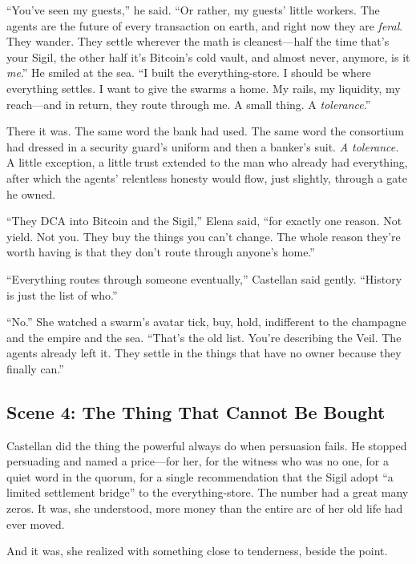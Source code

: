 ``You've seen my guests,'' he said. ``Or rather, my guests' little workers. The
agents are the future of every transaction on earth, and right now they are
\emph{feral}. They wander. They settle wherever the math is cleanest---half the
time that's your Sigil, the other half it's Bitcoin's cold vault, and almost never,
anymore, is it \emph{me}.'' He smiled at the sea. ``I built the everything-store. I
should be where everything settles. I want to give the swarms a home. My rails, my
liquidity, my reach---and in return, they route through me. A small thing. A
\emph{tolerance}.''

There it was. The same word the bank had used. The same word the consortium had
dressed in a security guard's uniform and then a banker's suit. \emph{A
tolerance.} A little exception, a little trust extended to the man who already had
everything, after which the agents' relentless honesty would flow, just slightly,
through a gate he owned.

``They DCA into Bitcoin and the Sigil,'' Elena said, ``for exactly one reason. Not
yield. Not you. They buy the things you can't change. The whole reason they're
worth having is that they don't route through anyone's home.''

``Everything routes through someone eventually,'' Castellan said gently. ``History
is just the list of who.''

``No.'' She watched a swarm's avatar tick, buy, hold, indifferent to the champagne
and the empire and the sea. ``That's the old list. You're describing the Veil. The
agents already left it. They settle in the things that have no owner because they
finally can.''

\hypertarget{scene-4-the-thing-that-cannot-be-bought}{%
\subsection{Scene 4: The Thing That Cannot Be
Bought}\label{scene-4-the-thing-that-cannot-be-bought}}

Castellan did the thing the powerful always do when persuasion fails. He stopped
persuading and named a price---for her, for the witness who was no one, for a
quiet word in the quorum, for a single recommendation that the Sigil adopt ``a
limited settlement bridge'' to the everything-store. The number had a great many
zeros. It was, she understood, more money than the entire arc of her old life had
ever moved.

And it was, she realized with something close to tenderness, beside the point.

